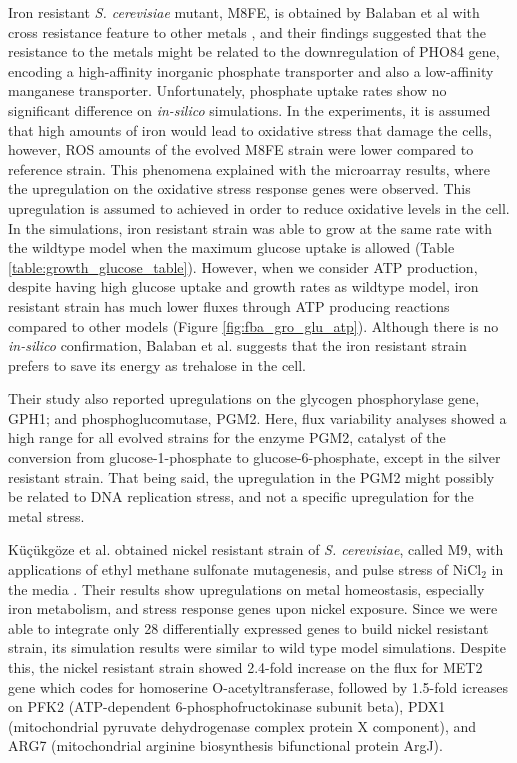 Iron resistant \emph{S. cerevisiae} mutant, M8FE, is obtained by Balaban et al with cross resistance feature to other metals \cite{balaban2020evolutionary}, and their findings suggested that the resistance to the metals might be related to the downregulation of PHO84 gene, encoding a high-affinity inorganic phosphate transporter and also a low-affinity manganese transporter. Unfortunately, phosphate uptake rates show no significant difference on \emph{in-silico} simulations. In the experiments, it is assumed that high amounts of iron would lead to oxidative stress that damage the cells, however, ROS amounts of the evolved M8FE strain were lower compared to reference strain. This phenomena explained with the microarray results, where the upregulation on the oxidative stress response genes were observed. This upregulation is assumed to achieved in order to reduce oxidative levels in the cell. In the simulations, iron resistant strain was able to grow at the same rate with the wildtype model when the maximum glucose uptake is allowed (Table \ref{table:growth_glucose_table}). However, when we consider ATP production, despite having high glucose uptake and growth rates as wildtype model, iron resistant strain has much lower fluxes through ATP producing reactions compared to other models (Figure \ref{fig:fba_gro_glu_atp}). Although there is no \emph{in-silico} confirmation, Balaban et al. suggests that the iron resistant strain prefers to save its energy as trehalose in the cell.

Their study also reported upregulations on the glycogen phosphorylase gene, GPH1; and phosphoglucomutase, PGM2. Here, flux variability analyses showed a high range for all evolved strains for the enzyme PGM2, catalyst of the conversion from glucose-1-phosphate to glucose-6-phosphate, except in the silver resistant strain. That being said, the upregulation in the PGM2 might possibly be related to DNA replication stress, and not a specific upregulation for the metal stress.

Küçükgöze et al. obtained nickel resistant strain of \emph{S. cerevisiae}, called M9, with applications of ethyl methane sulfonate mutagenesis, and pulse stress of NiCl$_2$ in the media \cite{kuccukgoze2013evolutionary}. Their results show upregulations on metal homeostasis, especially iron metabolism, and stress response genes upon nickel exposure. Since we were able to integrate only 28 differentially expressed genes to build nickel resistant strain, its simulation results were similar to wild type model simulations. Despite this, the nickel resistant strain showed 2.4-fold increase on the flux for MET2 gene which codes for homoserine O-acetyltransferase, followed by 1.5-fold icreases on PFK2 (ATP-dependent 6-phosphofructokinase subunit beta), PDX1 (mitochondrial pyruvate dehydrogenase complex protein X component), and ARG7 (mitochondrial arginine biosynthesis bifunctional protein ArgJ).

